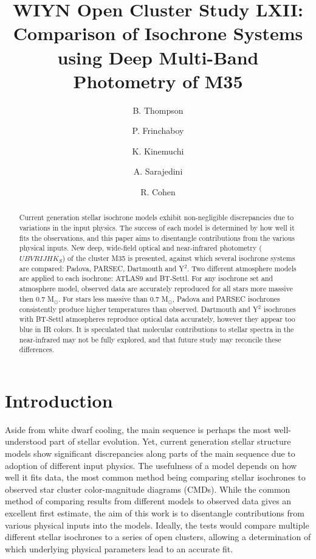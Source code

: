 \documentclass[iop]{emulateapj}
\begin{document}
\title{WIYN Open Cluster Study LXII: Comparison of Isochrone Systems using Deep Multi-Band Photometry of M35}

\author{B. Thompson}
\author{P. Frinchaboy}

\author{K. Kinemuchi}

\author{A. Sarajedini}

\author{R. Cohen}



\begin{abstract}
Current generation stellar isochrone models exhibit non-negligible discrepancies due to variations in the input physics. The success of each model is determined by how well it fits the observations, and this paper aims to disentangle contributions from the various physical inputs. New deep, wide-field optical and near-infrared photometry ($UBVRIJHK_S$) of the cluster M35 is presented, against which several isochrone systems are compared: Padova, PARSEC, Dartmouth and Y$^2$. Two different atmosphere models are applied to each isochrone: ATLAS9 and BT-Settl. For any isochrone set and atmosphere model, observed data are accurately reproduced for all stars more massive then $0.7$ M$_\odot$. For stars less massive than 0.7 M$_\odot$, Padova and PARSEC isochrones consistently produce higher temperatures than observed. Dartmouth and Y$^2$ isochrones with BT-Settl atmospheres reproduce optical data accurately, however they appear too blue in IR colors. It is speculated that molecular contributions to stellar spectra in the near-infrared may not be fully explored, and that future study may reconcile these differences.
\end{abstract}


\section{Introduction}
Aside from white dwarf cooling, the main sequence is perhaps the most well-understood part of stellar evolution. Yet, current generation stellar structure models show significant discrepancies along parts of the main sequence due to adoption of different input physics. The usefulness of a model depends on how well it fits data, the most common method being comparing stellar isochrones to observed star cluster color-magnitude diagrams (CMDs). While the common method of comparing results from different models to observed data gives an excellent first estimate, the aim of this work is to disentangle contributions from various physical inputs into the models. Ideally, the tests would compare multiple different stellar isochrones to a series of open clusters, allowing a determination of which underlying physical parameters lead to an accurate fit.
\end{document}

